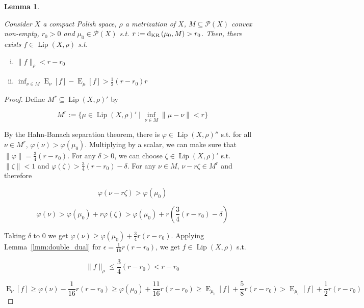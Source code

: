 \documentclass[11pt]{article}
\theoremstyle{definition}
\theoremstyle{plain}
\newtheorem{lemma}{Lemma}%
\newcommand{\N}[1]{\lVert #1 \rVert}
\DeclareMathOperator{\E}{E}
\newcommand{\PM}{\mathcal{P}}
\newcommand{\Lp}{{\operatorname{Lip}}}
\newcommand{\DKR}{\operatorname{d}_{\textnormal{KR}}}
\begin{document}
\begin{samepage}
\begin{lemma}
\label{lmm:separation}

Consider $X$ a compact Polish space, $\rho$ a metrization of $X$, $M \subseteq \PM\left(X\right)$ convex non-empty, $r_0 > 0$ and $\mu_0 \in \PM\left(X\right)$ s.t. $r:=\DKR\left(\mu_0,M\right) > r_0$. Then, there exists $f \in \Lp\left(X,\rho\right)$ s.t.

\begin{enumerate}[i.]

\item $\N{f}_\rho < r - r_0$
\item $\inf_{\nu \in M} \E_\nu\left[f\right] - \E_\mu\left[f\right] > \frac{1}{2}\left(r-r_0\right)r$

\end{enumerate}

\end{lemma}
\end{samepage}

\begin{proof}

Define $M^r \subseteq \Lp\left(X,\rho\right)'$ by

$$M^r:=\{\mu \in \Lp\left(X,\rho\right)' \mid \inf_{\nu \in M} \N{\mu - \nu} < r\}$$

By the Hahn-Banach separation theorem, there is $\varphi \in \Lp\left(X,\rho\right)''$ s.t. for all $\nu \in M^r$, $\varphi\left(\nu\right) > \varphi\left(\mu_0\right)$. Multiplying by a scalar, we can make sure that $\N{\varphi} = \frac{3}{4}\left(r - r_0\right)$. For any $\delta > 0$, we can choose $\zeta \in \Lp\left(X,\rho\right)'$ s.t. $\N{\zeta} < 1$ and $\varphi\left(\zeta\right) > \frac{3}{4}\left(r-r_0\right) - \delta$.  For any $\nu \in M$, $\nu - r \zeta \in M^r$ and therefore

$$\varphi\left(\nu - r \zeta\right) > \varphi\left(\mu_0\right)$$

$$\varphi\left(\nu\right) > \varphi\left(\mu_0\right) + r \varphi\left(\zeta\right) > \varphi\left(\mu_0\right) + r \left(\frac{3}{4}\left(r-r_0\right) - \delta\right)$$

Taking $\delta$ to 0 we get $\varphi\left(\nu\right) \geq \varphi\left(\mu_0\right) + \frac{3}{4} r \left(r - r_0\right)$. Applying Lemma~\ref{lmm:double_dual} for $\epsilon = \frac{1}{16} r \left(r - r_0\right)$, we get $f \in \Lp\left(X,\rho\right)$ s.t.

$$\N{f}_\rho \leq \frac{3}{4} \left(r - r_0\right) < r - r_0$$ 

$$\E_\nu\left[f\right] \geq \varphi\left(\nu\right) - \frac{1}{16} r \left(r - r_0\right) \geq \varphi\left(\mu_0\right) + \frac{11}{16} r \left(r - r_0\right) \geq \E_{\mu_0}\left[f\right] +  \frac{5}{8} r \left(r - r_0\right) > \E_{\mu_0}\left[f\right] +  \frac{1}{2} r \left(r - r_0\right)$$
\end{proof}
\end{document}
